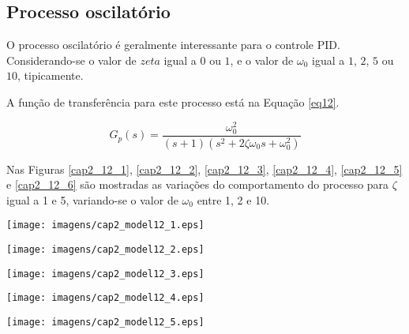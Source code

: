 \subsection{Processo oscilatório}

    O processo oscilatório é geralmente interessante para o controle \acs{PID}.
    Considerando-se o valor de $zeta$ igual a $0$ ou $1$, e o valor de $\omega _0$
    igual a $1$, $2$, $5$ ou $10$, tipicamente.

    A função de transferência para este processo está na Equação \ref{eq12}.

    \begin{equation}
        \label{eq12}
        G_p(s) = \frac{\omega _0^2}{(s+1)(s^2+2\zeta \omega _0 s+\omega _0^2)}
    \end{equation}
    
    Nas Figuras \ref{cap2_12_1}, \ref{cap2_12_2}, \ref{cap2_12_3}, \ref{cap2_12_4},
    \ref{cap2_12_5} e \ref{cap2_12_6}
    são mostradas as variações do comportamento do processo para $\zeta$
    igual a 1 e 5, variando-se o valor de $\omega _0$ entre 1, 2 e 10.
    
    \begin{center}
        \texttt{[image: imagens/cap2\_model12\_1.eps]}
	\label{cap2_12_1}
    \end{center}
    
    \begin{center}
        \texttt{[image: imagens/cap2\_model12\_2.eps]}
	\label{cap2_12_2}
    \end{center}
    
    \begin{center}
        \texttt{[image: imagens/cap2\_model12\_3.eps]}
	\label{cap2_12_3}
    \end{center}
    
    \begin{center}
        \texttt{[image: imagens/cap2\_model12\_4.eps]}
        \label{cap2_12_4}
    \end{center}
    
    \begin{center}
        \texttt{[image: imagens/cap2\_model12\_5.eps]}
	\label{cap2_12_5}
    \end{center}
    
